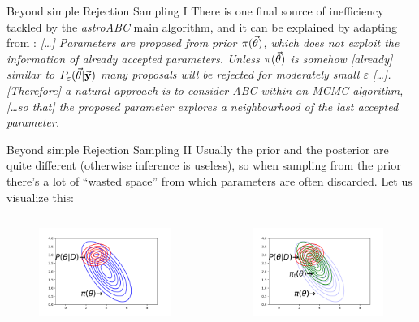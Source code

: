 \documentclass{beamer}
\theoremstyle{remark}
\newcommand{\nologo}{\setbeamertemplate{logo}{}} %
\begin{document}
\begin{frame}{Beyond simple Rejection Sampling I}
There is one final source of inefficiency tackled by the \textit{astroABC} main algorithm, and it can be explained by adapting from \cite{abc_slides}: \textit{[\dots] Parameters are proposed from prior $\pi(\va{\theta})$, which does not exploit the information of already accepted parameters. Unless $\pi(\va{\theta})$ is somehow [already] similar to $P_\varepsilon(\va{\theta}|\va{y})$ many proposals will be rejected for moderately small $\varepsilon$ [\dots]. [Therefore] a natural approach is to consider ABC within an MCMC algorithm, [\dots so that] the proposed parameter explores a neighbourhood of the last accepted parameter.}
\end{frame}

{\nologo
\begin{frame}{Beyond simple Rejection Sampling II}
Usually the prior and the posterior are quite different (otherwise inference is useless), so when sampling from the prior there's a lot of ``wasted space'' from which parameters are often discarded. Let us visualize this:\pause
\begin{columns}
\begin{figure}[H]
    \centering
    \includegraphics[width=1.1\textwidth]{prior_vs_posterior.pdf}
\end{figure}
\pause
{}
\begin{figure}[H]
    \centering
    \includegraphics[width=1.1\textwidth]{prior_vs_posterior_with_pi_t.pdf}

\end{figure}
\end{columns}
\end{frame}}
\end{document}
